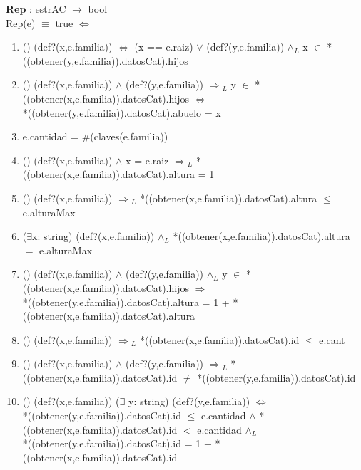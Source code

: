 \documentclass[10pt, a4paper]{article}
\begin{document}
	
	   \textbf{Rep} : estrAC $\longrightarrow$ bool\\
	        Rep(e) $\equiv$ true $\Longleftrightarrow$\\
	
	   \begin{enumerate}

	   \item() (def?(x,e.familia)) $\Longleftrightarrow$ (x == e.raiz) $\vee$ (def?(y,e.familia)) $\wedge{_L}$ x $\in$ *((obtener(y,e.familia)).datosCat).hijos
	       
	    \item () (def?(x,e.familia)) $\wedge$ (def?(y,e.familia)) $\Rightarrow{_L}$ y $\in$ *((obtener(x,e.familia)).datosCat).hijos $\Leftrightarrow$ \\ *((obtener(y,e.familia)).datosCat).abuelo = x

	    \item e.cantidad  = $\#$(claves(e.familia))  
	    
	    \item () (def?(x,e.familia)) $\wedge$ x = e.raiz $\Rightarrow{_L}$ *((obtener(x,e.familia)).datosCat).altura = 1
	    
	    \item () (def?(x,e.familia)) $\Rightarrow{_L}$ *((obtener(x,e.familia)).datosCat).altura $\leq$ e.alturaMax
	    
	    \item ($\exists$x: string) (def?(x,e.familia)) $\wedge{_L}$ *((obtener(x,e.familia)).datosCat).altura $=$ e.alturaMax
	    
	    \item () (def?(x,e.familia)) $\wedge$ (def?(y,e.familia)) $\wedge{_L}$ y $\in$ *((obtener(x,e.familia)).datosCat).hijos $\Rightarrow$ \\ *((obtener(y,e.familia)).datosCat).altura = 1 + *((obtener(x,e.familia)).datosCat).altura
	    
	    \item () (def?(x,e.familia)) $\Rightarrow{_L}$ *((obtener(x,e.familia)).datosCat).id $\leq$ e.cant
	    
	    \item () (def?(x,e.familia)) $\wedge$ (def?(y,e.familia)) $\Rightarrow{_L}$ *((obtener(x,e.familia)).datosCat).id $\neq$ *((obtener(y,e.familia)).datosCat).id
	    
	    \item () (def?(x,e.familia)) ($\exists$ y: string) (def?(y,e.familia)) $\Leftrightarrow$ \\ *((obtener(y,e.familia)).datosCat).id $\leq$ e.cantidad $\wedge$ *((obtener(x,e.familia)).datosCat).id $<$ e.cantidad $\wedge{_L}$ \\*((obtener(y,e.familia)).datosCat).id = 1 + *((obtener(x,e.familia)).datosCat).id
	    
\end{enumerate}
\end{document}
